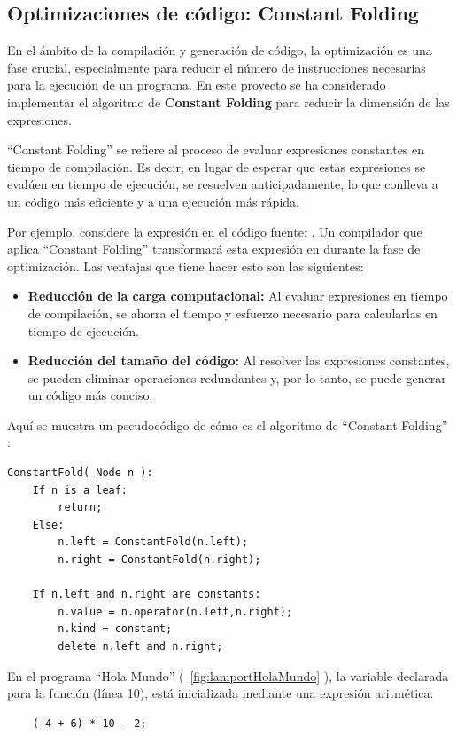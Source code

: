 \subsection{Optimizaciones de código: Constant Folding}
En el ámbito de la compilación y generación de código, la optimización es una fase crucial, especialmente para reducir el número de instrucciones necesarias para la ejecución de un programa. En este proyecto se ha considerado implementar el algoritmo de \textbf{Constant Folding} para reducir la dimensión de las expresiones.


``Constant Folding'' se refiere al proceso de evaluar expresiones constantes en tiempo de compilación. Es decir, en lugar de esperar que estas expresiones se evalúen en tiempo de ejecución, se resuelven anticipadamente, lo que conlleva a un código más eficiente y a una ejecución más rápida.


Por ejemplo, considere la expresión en el código fuente: . Un compilador que aplica ``Constant Folding'' transformará esta expresión en  durante la fase de optimización. Las ventajas que tiene hacer esto son las siguientes:

\begin{itemize}
    \item \textbf{Reducción de la carga computacional:} Al evaluar expresiones en tiempo de compilación, se ahorra el tiempo y esfuerzo necesario para calcularlas en tiempo de ejecución.
    \item \textbf{Reducción del tamaño del código:} Al resolver las expresiones constantes, se pueden eliminar operaciones redundantes y, por lo tanto, se puede generar un código más conciso.
\end{itemize}


\noindent
Aquí se muestra un pseudocódigo de cómo es el algoritmo de ``Constant Folding'' \cite[Capítulo 8]{thain2020introduction}:
\begin{verbatim}
ConstantFold( Node n ):
    If n is a leaf:
        return;
    Else:
        n.left = ConstantFold(n.left);
        n.right = ConstantFold(n.right);
    
    If n.left and n.right are constants:
        n.value = n.operator(n.left,n.right);
        n.kind = constant;
        delete n.left and n.right;
\end{verbatim}

En el programa ``Hola Mundo'' (~\ref{fig:lamportHolaMundo} ), la variable  declarada para la función  (línea 10), está inicializada mediante una expresión aritmética: \begin{verbatim}
    (-4 + 6) * 10 - 2;
\end{verbatim}

